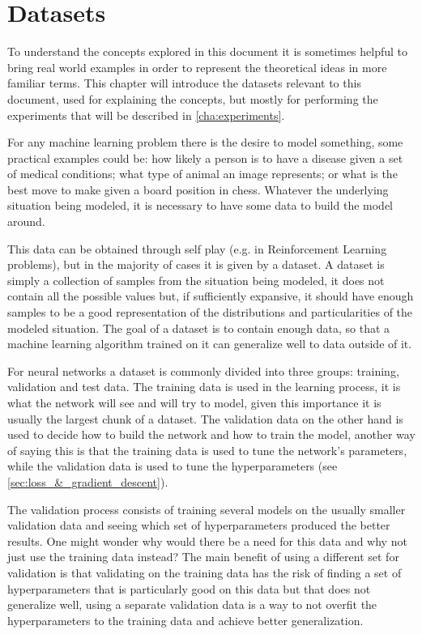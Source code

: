 \chapter{Datasets} \label{cha:datasets}
To understand the concepts explored in this document it is sometimes helpful to bring real world examples in order to represent the theoretical ideas in more familiar terms. This chapter will introduce the datasets relevant to this document, used for explaining the concepts, but mostly for performing the experiments that will be described in \autoref{cha:experiments}.

For any machine learning problem there is the desire to model something, some practical examples could be: how likely a person is to have a disease given a set of medical conditions; what type of animal an image represents; or what is the best move to make given a board position in chess. Whatever the underlying situation being modeled, it is necessary to have some data to build the model around.

This data can be obtained through self play (e.g. in Reinforcement Learning problems), but in the majority of cases it is given by a dataset. A dataset is simply a collection of samples from the situation being modeled, it does not contain all the possible values but, if sufficiently expansive, it should have enough samples to be a good representation of the distributions and particularities of the modeled situation. The goal of a dataset is to contain enough data, so that a machine learning algorithm trained on it can generalize well to data outside of it.

For neural networks a dataset is commonly divided into three groups: training, validation and test data. The training data is used in the learning process, it is what the network will see and will try to model, given this importance it is usually the largest chunk of a dataset. The validation data on the other hand is used to decide how to build the network and how to train the model, another way of saying this is that the training data is used to tune the network's parameters, while the validation data is used to tune the hyperparameters (see \autoref{sec:loss_&_gradient_descent}).

The validation process consists of training several models on the usually smaller validation data and seeing which set of hyperparameters produced the better results. One might wonder why would there be a need for this data and why not just use the training data instead? The main benefit of using a different set for validation is that validating on the training data has the risk of finding a set of hyperparameters that is particularly good on this data but that does not generalize well, using a separate validation data is a way to not overfit the hyperparameters to the training data and achieve better generalization.

